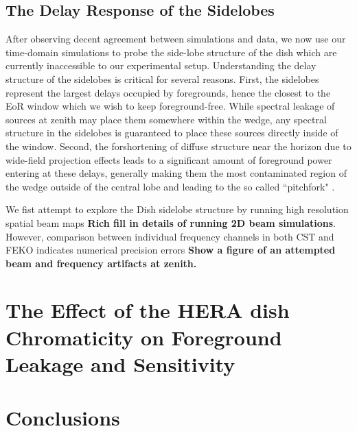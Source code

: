 \documentclass[twocolumn]{emulateapj}
\begin{document}
\subsection{The Delay Response of the Sidelobes}
 After observing decent agreement between simulations and data, we now use our time-domain simulations to probe the side-lobe structure of the dish which are currently inaccessible to our experimental setup. Understanding the delay structure of the sidelobes is critical for several reasons. First, the sidelobes represent the largest delays occupied by foregrounds, hence the closest to the EoR window which we wish to keep foreground-free. While spectral leakage of sources at zenith may place them somewhere within the wedge, any spectral structure in the sidelobes is guaranteed to place these sources directly inside of the window. Second, the forshortening of diffuse structure near the horizon due to wide-field projection effects leads to a significant amount of foreground power entering at these delays, generally making them the most contaminated region of the wedge outside of the central lobe and leading to the so called ``pitchfork" \citep{Thyagarajan:2015a,Thyagarajan:2015b}. 
 
 We fist attempt to explore the Dish sidelobe structure by running high resolution spatial beam maps {\bf Rich fill in details of running 2D beam simulations}. However, comparison between individual frequency channels in both CST and FEKO indicates numerical precision errors {\bf Show a figure of an attempted beam and frequency artifacts at zenith.}


\section{The Effect of the HERA dish Chromaticity on Foreground Leakage and Sensitivity}
\label{sec:Foregrounds}
\section{Conclusions}
\label{sec:Conclusion}



\appendix
\end{document}
